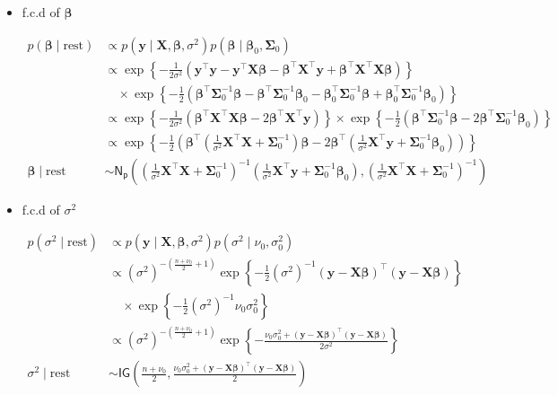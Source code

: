 \begin{appendix}
\begin{itemize}
\newpage

\item f.c.d of $\bm{\beta}$ 

\begin{equation}
\begin{split}
p(\bm{\beta} \mid \text{rest})&\propto 
p(\bm{y} \mid \bm{X}, \bm{\beta}, \sigma^2)
p(\bm{\beta} \mid \bm{\beta}_0, \bm{\Sigma}_0) \\
&\propto \exp\left\{ -\frac{1}{2\sigma^2} (\bm{y}^\top \bm{y} - \bm{y}^\top \bm{X} \bm{\beta} - \bm{\beta}^\top\bm{X}^\top \bm{y} + \bm{\beta}^\top \bm{X}^\top \bm{X} \bm{\beta}) \right\} \\
&\quad \times \exp\left\{ -\frac{1}{2} \left( \bm{\beta}^\top \bm{\Sigma}_0^{-1} \bm{\beta} -  \bm{\beta}^\top \bm{\Sigma}_0^{-1} \bm{\beta}_0 - \bm{\beta}_0^\top \bm{\Sigma}_0^{-1} \bm{\beta} + \bm{\beta}_0^\top \bm{\Sigma}_0^{-1} \bm{\beta}_0 \right) \right\} \\
&\propto \exp\left\{ -\frac{1}{2\sigma^2} (\bm{\beta}^\top \bm{X}^\top \bm{X} \bm{\beta} - 2 \bm{\beta}^\top \bm{X}^\top \bm{y}) \right\} \times \exp\left\{ -\frac{1}{2} (\bm{\beta}^\top \bm{\Sigma}_0^{-1} \bm{\beta} - 2 \bm{\beta}^\top \bm{\Sigma}_0^{-1} \bm{\beta}_0) \right\} \\
&\propto \exp\left\{ -\frac{1}{2} \left( \bm{\beta}^\top \left( \frac{1}{\sigma^2} \bm{X}^\top \bm{X} + \bm{\Sigma}_0^{-1} \right) \bm{\beta} - 2 \bm{\beta}^\top \left( \frac{1}{\sigma^2} \bm{X}^\top \bm{y} + \bm{\Sigma}_0^{-1} \bm{\beta}_0 \right) \right) \right\} \\
\bm{\beta} \mid \text{rest} &\sim \mathsf{N_p}\left(\left( \frac{1}{\sigma^2} \bm{X}^\top \bm{X} + \bm{\Sigma}_0^{-1} \right)^{-1}\left( \frac{1}{\sigma^2} \bm{X}^\top \bm{y} + \bm{\Sigma}_0^{-1} \bm{\beta}_0 \right), \left( \frac{1}{\sigma^2} \bm{X}^\top \bm{X} + \bm{\Sigma}_0^{-1} \right)^{-1}\right)
\end{split}
\end{equation}

\item f.c.d of $\sigma^2$

\begin{equation}
\begin{split}
p(\sigma^2 \mid \text{rest})&\propto 
p(\bm{y} \mid \bm{X}, \bm{\beta}, \sigma^2)
p(\sigma^2 \mid \nu_0, \sigma_0^2) \\
&\propto (\sigma^2)^{-\left(\frac{n + \nu_0}{2} + 1\right)} 
\exp\left\{ -\frac{1}{2} (\sigma^2)^{-1} (\bm{y} - \bm{X} \bm{\beta})^\top (\bm{y} - \bm{X} \bm{\beta}) \right\} \\
&\quad \times \exp\left\{ -\frac{1}{2} (\sigma^2)^{-1} \nu_0 \sigma_0^2 \right\} \\
&\propto (\sigma^2)^{-\left(\frac{n + \nu_0}{2} + 1\right)} 
\exp\left\{ - \frac{\nu_0 \sigma_0^2 + (\bm{y} - \bm{X} \bm{\beta})^\top (\bm{y} - \bm{X} \bm{\beta})}{2\sigma^2} \right\} \\
\sigma^2 \mid \text{rest} &\sim \mathsf{IG}\left( \frac{n + \nu_0}{2}, \frac{\nu_0 \sigma_0^2 + (\bm{y} - \bm{X} \bm{\beta})^\top (\bm{y} - \bm{X} \bm{\beta})}{2} \right)
\end{split}
\end{equation}


\end{itemize}
\end{appendix}
